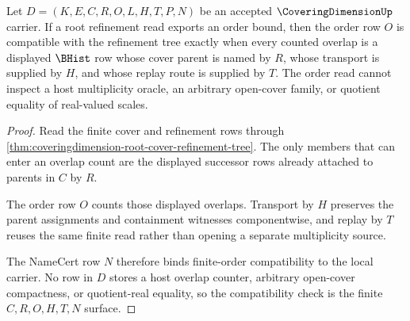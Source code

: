 \begin{theorem}
\label{thm:coveringdimension-root-finite-order-compatibility}
Let $D=(K,E,C,R,O,L,H,T,P,N)$ be an accepted $\CoveringDimensionUp$ carrier. If a root refinement read exports an order bound, then the order row $O$ is compatible with the refinement tree exactly when every counted overlap is a displayed $\BHist$ row whose cover parent is named by $R$, whose transport is supplied by $H$, and whose replay route is supplied by $T$. The order read cannot inspect a host multiplicity oracle, an arbitrary open-cover family, or quotient equality of real-valued scales.
\end{theorem}
\begin{proof}
Read the finite cover and refinement rows through \autoref{thm:coveringdimension-root-cover-refinement-tree}. The only members that can enter an overlap count are the displayed successor rows already attached to parents in $C$ by $R$.

The order row $O$ counts those displayed overlaps. Transport by $H$ preserves the parent assignments and containment witnesses componentwise, and replay by $T$ reuses the same finite read rather than opening a separate multiplicity source.

The NameCert row $N$ therefore binds finite-order compatibility to the local carrier. No row in $D$ stores a host overlap counter, arbitrary open-cover compactness, or quotient-real equality, so the compatibility check is the finite $C,R,O,H,T,N$ surface.
\end{proof}


